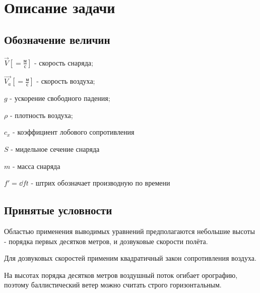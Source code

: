 \section{Описание задачи}
\subsection{Обозначение величин}
\paragraph{}
$ \vec{V} \left [ = \frac{\mbox{м}}{\mbox{с}} \right ] $ - скорость снаряда;

$ \vec{V_a} \left [ = \frac{\mbox{м}}{\mbox{с}} \right ] $ - скорость воздуха;

$g$ - ускорение свободного падения;

$\rho$ - плотность воздуха;

$c_x$ - коэффициент лобового сопротивления

$S$ - мидельное сечение снаряда

$m$ - масса снаряда

$f'=\dd{f}{t}$ - штрих обозначает производную по времени

\subsection{Принятые условности}
Областью применения выводимых уравнений предполагаются небольшие высоты - порядка первых десятков метров, и дозвуковые скорости полёта.

Для дозвуковых скоростей применим квадратичный закон сопротивления воздуха.

На высотах порядка десятков метров воздушный поток огибает орографию, поэтому баллистический ветер можно считать строго горизонтальным.



